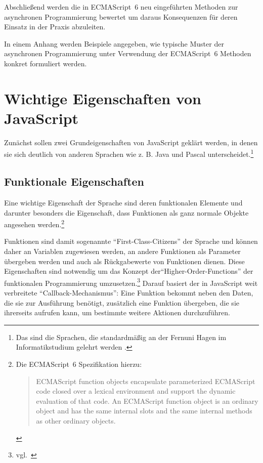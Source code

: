 \documentclass[
11pt, %
a4paper, %
oneside, %
pdfspacing, %
headinclude,
BCOR5mm, %
ngerman, %
bibtotocnumbered,
]{scrartcl}
\begin{document}
Abschließend werden die in ECMAScript~6 neu eingeführten Methoden zur asynchronen Programmierung bewertet um daraus Konsequenzen für deren Einsatz in der Praxis abzuleiten.

In einem Anhang werden Beispiele angegeben, wie typische Muster der asynchronen Programmierung unter Verwendung der ECMAScript~6 Methoden konkret formuliert werden.

\section{Wichtige Eigenschaften von \-JavaScript}

	Zunächst sollen zwei Grundeigenschaften von JavaScript geklärt werden, in denen sie sich deutlich von anderen Sprachen wie z. B. Java und Pascal unterscheidet.\footnote{Das sind die Sprachen, die standardmäßig an der Fernuni Hagen im Informatikstudium gelehrt werden \citep{FernUniHagen.2016}.}
	
	\subsection{Funktionale Eigenschaften}
		
		Eine wichtige Eigenschaft der Sprache sind deren funktionalen Elemente und darunter besonders die Eigenschaft, dass Funktionen als ganz normale Objekte angesehen werden.\footnote{Die ECMAScript~6 Spezifikation hierzu:\begin{quote}
		ECMAScript function objects encapsulate parameterized ECMAScript code closed over a lexical environment and support the dynamic evaluation of that code. An ECMAScript function object is an ordinary object and has the same internal slots and the same internal methods as other ordinary objects.~\citep[~{\S}9.2]{EcmaTC39.}\end{quote}} 	
		
		Funktionen sind damit sogenannte "`First-Class-Citizens"' der Sprache und können daher an Variablen zugewiesen werden, an andere Funktionen als Parameter übergeben werden und auch als Rückgabewerte von Funktionen dienen. Diese Eigenschaften sind notwendig um das Konzept der"`Higher-Order-Functions"' der funktionalen Programmierung umzusetzen.\footnote{vgl.~\citep[S.~148 ff.]{Ganzinger.2011}} 
		Darauf basiert der in JavaScript weit verbreitete "`Callback-Mechanismus"': Eine Funktion bekommt neben den Daten, die sie zur Ausführung benötigt, zusätzlich eine Funktion übergeben, die sie ihrerseits aufrufen kann, um bestimmte weitere Aktionen durchzuführen.
		
\end{document}
